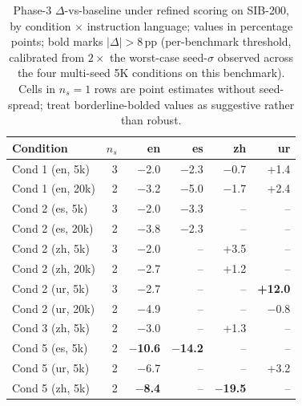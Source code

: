 
\begin{table}[t]
  \centering
  \small
  \begin{tabular}{lrrrrr}
    \toprule
    Condition & $n_s$ & en & es & zh & ur \\
    \midrule
    Cond 1 (en, 5k) & 3 & $-$2.0 & $-$2.3 & $-$0.7 & +1.4 \\
    Cond 1 (en, 20k) & 2 & $-$3.2 & $-$5.0 & $-$1.7 & +2.4 \\
    Cond 2 (es, 5k) & 3 & $-$2.0 & $-$3.3 & -- & -- \\
    Cond 2 (es, 20k) & 2 & $-$3.8 & $-$2.3 & -- & -- \\
    Cond 2 (zh, 5k) & 3 & $-$2.0 & -- & +3.5 & -- \\
    Cond 2 (zh, 20k) & 2 & $-$2.7 & -- & +1.2 & -- \\
    Cond 2 (ur, 5k) & 3 & $-$2.7 & -- & -- & \textbf{+12.0} \\
    Cond 2 (ur, 20k) & 2 & $-$4.9 & -- & -- & $-$0.8 \\
    Cond 3 (zh, 5k) & 2 & $-$3.0 & -- & +1.3 & -- \\
    Cond 5 (es, 5k) & 2 & \textbf{$-$10.6} & \textbf{$-$14.2} & -- & -- \\
    Cond 5 (ur, 5k) & 2 & $-$6.7 & -- & -- & +3.2 \\
    Cond 5 (zh, 5k) & 2 & \textbf{$-$8.4} & -- & \textbf{$-$19.5} & -- \\
    \bottomrule
  \end{tabular}
  \caption{Phase-3 $\Delta$-vs-baseline under refined scoring on \textsc{SIB-200}, by condition $\times$ instruction language; values in percentage points; bold marks $|\Delta| > 8$\,pp (per-benchmark threshold, calibrated from $2 \times$ the worst-case seed-$\sigma$ observed across the four multi-seed 5K conditions on this benchmark). Cells in $n_s\!=\!1$ rows are point estimates without seed-spread; treat borderline-bolded values as suggestive rather than robust.}
  \label{tab:t4-sib200-delta}
\end{table}

